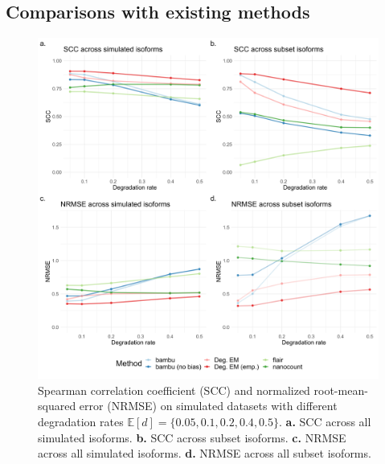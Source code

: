 \subsection{Comparisons with existing methods}

\begin{figure}[H]
    \centering
    \includegraphics[width=\textwidth]{figures/sec-4-scc-nrmse.png}
    \caption[Empirical results for SCC and NRMSE on simulated datasets]{Spearman correlation coefficient (SCC) and normalized root-mean-squared error (NRMSE) on simulated datasets with different degradation rates $\mathbb{E}[d]=\{0.05,0.1,0.2,0.4,0.5\}$. \textbf{a.} SCC across all simulated isoforms. \textbf{b.} SCC across subset isoforms. \textbf{c.} NRMSE across all simulated isoforms. \textbf{d.} NRMSE across all subset isoforms.}
    \label{fig:sec-4-scc-nrmse}
\end{figure}

